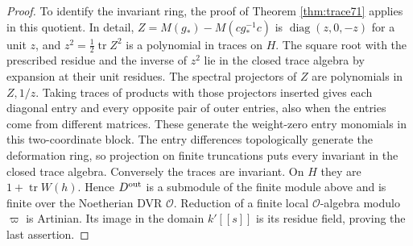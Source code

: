 \documentclass[a4paper,11pt]{article}
\theoremstyle{definition}
\theoremstyle{remark}
\numberwithin{equation}{section}
\newcommand{\OO}{\mathcal O}
\begin{document}
\begin{proof}
To identify the invariant ring, the proof of
Theorem \ref{thm:trace71}
applies in this quotient. In detail, \(Z=M(g_*)-M(cg_*^{-1}c)\)
is \(\operatorname{diag}(z,0,-z)\) for a unit \(z\), and
\(z^2=\tfrac12\operatorname{tr}Z^2\) is a polynomial in traces
on \(H\). The square root with the prescribed residue and the
inverse of \(z^2\) lie in the closed trace algebra by expansion
at their unit residues. The spectral projectors of \(Z\) are
polynomials in \(Z,1/z\). Taking traces of products with those
projectors inserted gives each diagonal entry and every opposite
pair of outer entries, also when the entries come from different
matrices. These generate the weight-zero entry monomials in this
two-coordinate block. The entry differences topologically
generate the deformation ring, so projection on finite
truncations puts every invariant in the closed trace algebra.
Conversely the traces are invariant. On \(H\) they are
\(1+\operatorname{tr}W(h)\). Hence \(D^{\rm out}\) is a
submodule of the finite module above and is finite over the
Noetherian DVR \(\OO\). Reduction of a finite local \(\OO\)-algebra
modulo \(\varpi\) is Artinian. Its image in the domain \(k'[[s]]\)
is its residue field, proving the last assertion.
\end{proof}
\end{document}
